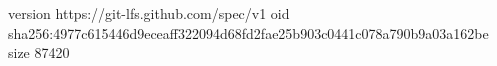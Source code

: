 version https://git-lfs.github.com/spec/v1
oid sha256:4977c615446d9eceaff322094d68fd2fae25b903c0441c078a790b9a03a162be
size 87420
